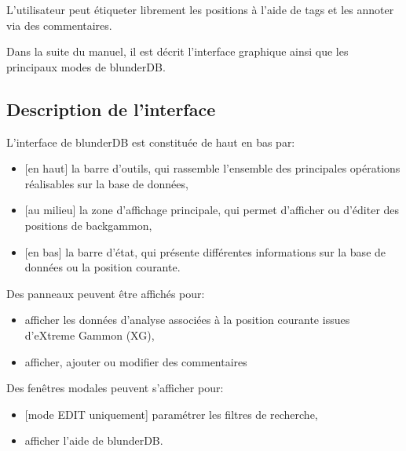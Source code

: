 \documentclass[letterpaper,10pt,french]{sphinxmanual}
\begin{document}
\sphinxAtStartPar
L’utilisateur peut étiqueter librement les positions à l’aide de tags et les
annoter via des commentaires.

\sphinxAtStartPar
Dans la suite du manuel, il est décrit l’interface graphique ainsi que
les principaux modes de blunderDB.


\subsection{Description de l’interface}
\label{\detokenize{manuel:description-de-l-interface}}
\sphinxAtStartPar
L’interface de blunderDB est constituée de haut en bas par:
\begin{itemize}
\item {} 
\sphinxAtStartPar
{[}en haut{]} la barre d’outils, qui rassemble l’ensemble des principales
opérations réalisables sur la base de données,

\item {} 
\sphinxAtStartPar
{[}au milieu{]} la zone d’affichage principale, qui permet d’afficher ou d’éditer des
positions de backgammon,

\item {} 
\sphinxAtStartPar
{[}en bas{]} la barre d’état, qui présente différentes informations sur la
base de données ou la position courante.

\end{itemize}

\sphinxAtStartPar
Des panneaux peuvent être affichés pour:
\begin{itemize}
\item {} 
\sphinxAtStartPar
afficher les données d’analyse associées à la position courante issues d’eXtreme Gammon (XG),

\item {} 
\sphinxAtStartPar
afficher, ajouter ou modifier des commentaires

\end{itemize}

\sphinxAtStartPar
Des fenêtres modales peuvent s’afficher pour:
\begin{itemize}
\item {} 
\sphinxAtStartPar
{[}mode EDIT uniquement{]} paramétrer les filtres de recherche,

\item {} 
\sphinxAtStartPar
afficher l’aide de blunderDB.

\end{itemize}
\end{document}
